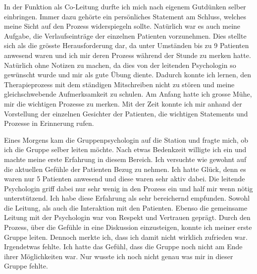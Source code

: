 In der Funktion als Co-Leitung durfte ich mich nach eigenem Gutdünken selber einbringen. Immer dazu gehörte ein persönliches Statement am Schluss, welches meine Sicht auf den Prozess widerspiegeln sollte. Natürlich war es auch meine Aufgabe, die Verlaufseinträge der einzelnen Patienten vorzunehmen. Dies stellte sich als die grösste Herausforderung dar, da unter Umständen bis zu 9 Patienten anwesend waren und ich mir deren Prozess während der Stunde zu merken hatte. Natürlich ohne Notizen zu machen, da dies von der leitenden Psychologin so gewünscht wurde und mir als gute Übung diente. Dadurch konnte ich lernen, den Therapieprozess mit dem ständigen Mitschreiben nicht zu stören und meine gleichschwebende Aufmerksamkeit zu schulen. Am Anfang hatte ich grosse Mühe, mir die wichtigen Prozesse zu merken. Mit der Zeit konnte ich mir anhand der Vorstellung der einzelnen Gesichter der Patienten, die wichtigen Statements und Prozesse in Erinnerung rufen. 

Eines Morgens kam die Gruppenpsychologin auf die Station und fragte mich, ob ich die Gruppe selber leiten möchte. Nach etwas Bedenkzeit willigte ich ein und machte meine erste Erfahrung in diesem Bereich. Ich versuchte wie gewohnt auf die aktuellen Gefühle der Patienten Bezug zu nehmen. Ich hatte Glück, denn es waren nur 5 Patienten anwesend und diese waren sehr aktiv dabei. Die leitende Psychologin griff dabei nur sehr wenig in den Prozess ein und half mir wenn nötig unterstützend. Ich habe diese Erfahrung als sehr bereichernd empfunden. Sowohl die Leitung, als auch die Interaktion mit den Patienten. Ebenso die gemeinsame Leitung mit der Psychologin war von Respekt und Vertrauen geprägt. Durch den Prozess, über die Gefühle in eine Diskussion einzusteigen, konnte ich meiner erste Gruppe leiten. Dennoch merkte ich, dass ich damit nicht wirklich zufrieden war. Irgendetwas fehlte. Ich hatte das Gefühl, dass die Gruppe noch nicht am Ende ihrer Möglichkeiten war. Nur wusste ich noch nicht genau was mir in dieser Gruppe fehlte. 


